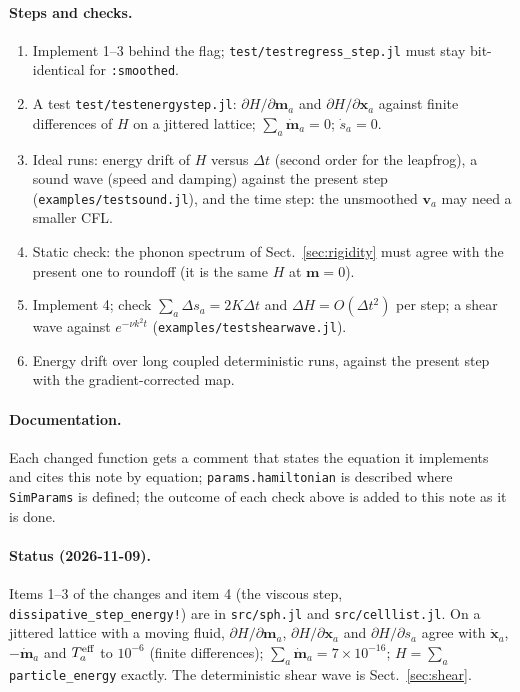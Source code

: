 \documentclass[11pt,aps,preprint,nofootinbib,superscriptaddress,tightenlines]{revtex4-2}
\def\Sect#1{Sect.~\ref{#1}}
\let\oldparagraph\paragraph
\renewcommand{\paragraph}{\par\bigskip\oldparagraph}
\begin{document}
\paragraph{Steps and checks.}
\begin{enumerate}
\item Implement 1--3 behind the flag; \texttt{test/testregress\_step.jl} must stay
  bit-identical for \texttt{:smoothed}.
\item A test \texttt{test/testenergystep.jl}: $\partial H/\partial\bm m_a$ and
  $\partial H/\partial\bm x_a$ against finite differences of $H$ on a jittered
  lattice; $\sum_a\dot{\bm m}_a=0$; $\dot s_a=0$.
\item Ideal runs: energy drift of $H$ versus $\Delta t$ (second order for the
  leapfrog), a sound wave (speed and damping) against the present step
  (\texttt{examples/testsound.jl}), and the time step: the unsmoothed $\bm v_a$ may
  need a smaller CFL.
\item Static check: the phonon spectrum of \Sect{sec:rigidity} must agree with the
  present one to roundoff (it is the same $H$ at $\bm m=0$).
\item Implement 4; check $\sum_a\Delta s_a=2K\Delta t$ and $\Delta H=O(\Delta t^2)$
  per step; a shear wave against $e^{-\nu k^2t}$ (\texttt{examples/testshearwave.jl}).
\item Energy drift over long coupled deterministic runs, against the present step with
  the gradient-corrected map.
\end{enumerate}

\paragraph{Documentation.}  Each changed function gets a comment that states the
equation it implements and cites this note by equation; \texttt{params.hamiltonian}
is described where \texttt{SimParams} is defined; the outcome of each check above
is added to this note as it is done.

\paragraph{Status (2026-11-09).}  Items 1--3 of the changes and item 4 (the viscous step,
\texttt{dissipative\_step\_energy!}) are in \texttt{src/sph.jl} and
\texttt{src/celllist.jl}.  On a jittered lattice with a moving fluid, $\partial H/\partial\bm
m_a$, $\partial H/\partial\bm x_a$ and $\partial H/\partial s_a$ agree with $\dot{\bm x}_a$,
$-\dot{\bm m}_a$ and $T^{\rm eff}_a$ to $10^{-6}$ (finite differences); $\sum_a\dot{\bm
m}_a=7\times10^{-16}$; $H=\sum_a$\texttt{particle\_energy} exactly.  The deterministic
shear wave is \Sect{sec:shear}.
\end{document}
